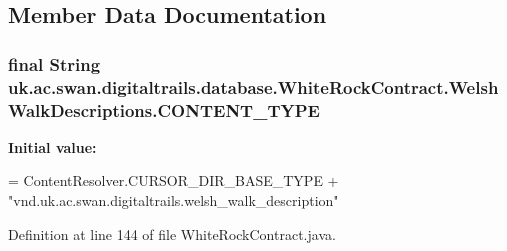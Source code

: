 \subsection{Member Data Documentation}
\hypertarget{classuk_1_1ac_1_1swan_1_1digitaltrails_1_1database_1_1_white_rock_contract_1_1_welsh_walk_descriptions_ab24624c2425d0338c572a919565ddfe5}{
\subsubsection[{C\+O\+N\+T\+E\+N\+T\+\_\+\+T\+Y\+P\+E}]{\setlength{\rightskip}{0pt plus 5cm}final String uk.\+ac.\+swan.\+digitaltrails.\+database.\+White\+Rock\+Contract.\+Welsh\+Walk\+Descriptions.\+C\+O\+N\+T\+E\+N\+T\+\_\+\+T\+Y\+P\+E\hspace{0.3cm}{\ttfamily [static]}}}\label{classuk_1_1ac_1_1swan_1_1digitaltrails_1_1database_1_1_white_rock_contract_1_1_welsh_walk_descriptions_ab24624c2425d0338c572a919565ddfe5}
{\bfseries Initial value\+:}
\begin{DoxyCode}
= ContentResolver.CURSOR\_DIR\_BASE\_TYPE +
                \textcolor{stringliteral}{"vnd.uk.ac.swan.digitaltrails.welsh\_walk\_description"}
\end{DoxyCode}


Definition at line 144 of file White\+Rock\+Contract.\+java.

